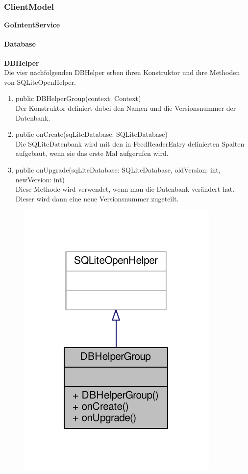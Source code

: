 \subsubsection{ClientModel}

\textbf{GoIntentService}

\paragraph{Database}

\textbf{DBHelper}\\
Die vier nachfolgenden DBHelper erben ihren Konstruktor und ihre Methoden von SQLiteOpenHelper. 
\begin{enumerate}
	\item public DBHelperGroup(context: Context)\\
		Der Konstruktor definiert dabei den Namen und die Versionsnummer der Datenbank.
	\item public onCreate(sqLiteDatabase: SQLiteDatabase)\\
		Die SQLiteDatenbank wird mit den in FeedReaderEntry definierten Spalten aufgebaut, wenn sie das erste Mal aufgerufen wird.
	\item public onUpgrade(sqLiteDatabase: SQLiteDatabase, oldVersion: int, newVersion: int)\\
		Diese Methode wird verwendet, wenn man die Datenbank verändert hat. Dieser wird dann eine neue Versionsnummer zugeteilt.	
\end{enumerate}
\begin{figure}[H]
	\includegraphics[scale = 1]{res/umlClasses/d_b_helper_group__coll__graph.pdf}
	\centering	
\end{figure}

